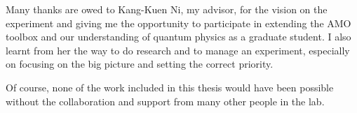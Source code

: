 
Many thanks are owed to Kang-Kuen Ni, my advisor,
for the vision on the experiment and giving me the opportunity
to participate in extending the AMO toolbox and our understanding of quantum physics
as a graduate student.
I also learnt from her the way to do research and to manage an experiment,
especially on focusing on the big picture and setting the correct priority.

Of course, none of the work included in this thesis would have been possible
without the collaboration and support from many other people in the lab.

